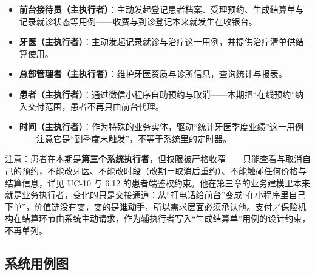 \documentclass[11pt,a4paper]{ctexart}
\begin{document}
\begin{itemize}[leftmargin=1.6em,topsep=3pt,itemsep=2pt]
  \item \textbf{前台接待员（主执行者）}：主动发起登记患者档案、受理预约、生成结算单与记录就诊状态等用例——收费与到诊登记本来就发生在收银台。
  \item \textbf{牙医（主执行者）}：主动发起记录就诊与治疗这一用例，并提供治疗清单供结算使用。
  \item \textbf{总部管理者（主执行者）}：维护牙医资质与诊所信息，查询统计与报表。
  \item \textbf{患者（主执行者）}：通过微信小程序自助预约与取消——本期把“在线预约”纳入交付范围，患者不再只由前台代理。
  \item \textbf{时间（主执行者）}：作为特殊的业务实体，驱动“统计牙医季度业绩”这一用例——注意它是“到季度末触发”，不等于系统里的定时器。
\end{itemize}

注意：患者在本期是\textbf{第三个系统执行者}，但权限被严格收窄——只能查看与取消自己的预约，不能改牙医、不能改时段（改期＝取消后重约）、不能触碰任何价格与结算信息，详见 UC-10 与 6.12 的患者端鉴权约束。他在第三章的业务建模里本来就是业务执行者，变化的只是交接通道：从“打电话给前台”变成“在小程序里自己下单”，价值链没有变，变的是\textbf{谁动手}，所以需求层面必须承认他。支付／保险机构在结算环节由系统主动请求，作为辅执行者写入“生成结算单”用例的设计约束，不再单列。

\subsection{系统用例图}
\end{document}
